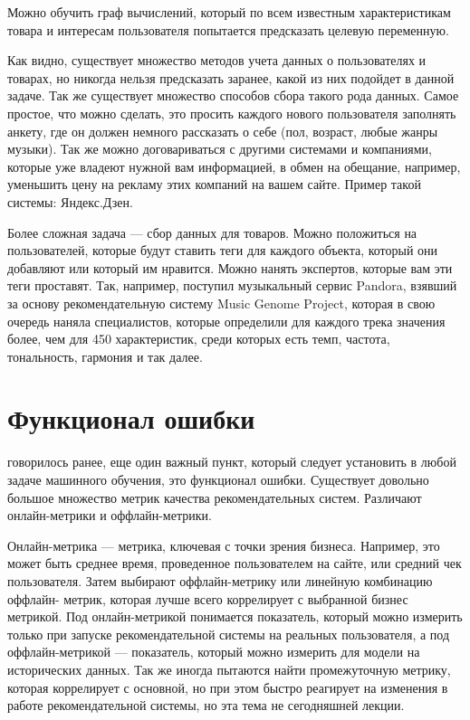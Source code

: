 \documentclass{article}
\newcommand\tab[1][1cm]{\hspace*{#1}}
\begin{document}
Можно обучить граф вычислений, который по всем известным характеристикам товара и интересам пользователя попытается предсказать целевую переменную.

Как видно, существует множество методов учета данных о пользователях и товарах, но никогда нельзя предсказать заранее, какой из них подойдет в данной задаче. Так же существует множество способов сбора такого рода данных. Самое простое, что можно сделать, это просить каждого нового пользователя заполнять анкету, где он должен немного рассказать о себе (пол, возраст, любые жанры музыки). Так же можно договариваться с другими системами и компаниями, которые уже владеют нужной вам информацией, в обмен на обещание, например, уменьшить цену на рекламу этих компаний на вашем сайте. Пример такой системы: Яндекс.Дзен.


Более сложная задача — сбор данных для товаров. Можно положиться на пользователей, которые будут ставить теги для каждого объекта, который они добавляют или который им нравится. Можно нанять экспертов, которые вам эти теги проставят. Так, например, поступил музыкальный сервис Pandora, взявший за основу рекомендательную систему Music Genome Project, которая в свою очередь наняла специалистов, которые определили для каждого трека значения более, чем для 450 характеристик, среди которых есть темп, частота, тональность, гармония и так далее.
\section*{Функционал ошибки}
 говорилось ранее, еще один важный пункт, который следует установить в любой задаче машинного обучения, это функционал ошибки. Существует довольно большое множество метрик качества рекомендательных систем. Различают онлайн-метрики и оффлайн-метрики.

Онлайн-метрика — метрика, ключевая с точки зрения бизнеса. Например, это может быть среднее время, проведенное пользователем на сайте, или средний чек пользователя. Затем выбирают оффлайн-метрику или линейную комбинацию оффлайн- метрик, которая лучше всего коррелирует с выбранной бизнес метрикой. Под онлайн-метрикой понимается показатель, который можно измерить только при запуске рекомендательной системы на реальных пользователя, а под оффлайн-метрикой — показатель, который можно измерить для модели на исторических данных. Так же иногда пытаются найти промежуточную метрику, которая коррелирует с основной, но при этом быстро реагирует на изменения в работе рекомендательной системы, но эта тема не сегодняшней лекции.\\
\end{document}
